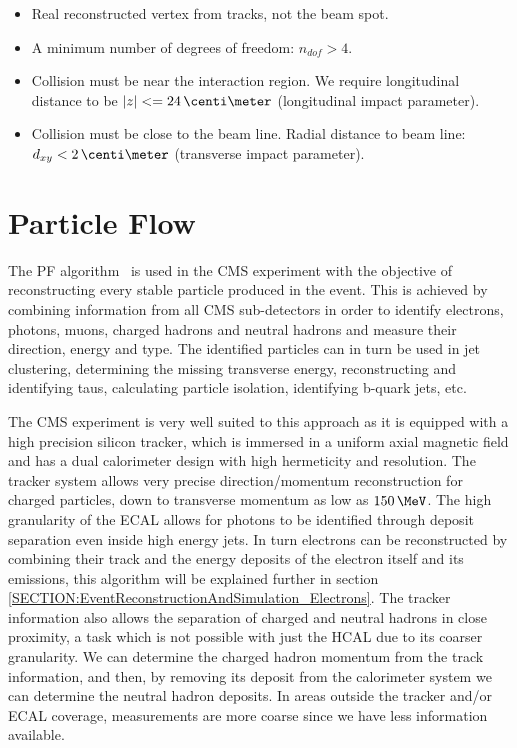 \begin{itemize}
  \item Real reconstructed vertex from tracks, not the beam spot.
  \item A minimum number of degrees of freedom: $n_{dof}>4$.
  \item Collision must be near the interaction region. We require longitudinal distance to be $|z|<=24\,\centi\meter$ (longitudinal impact parameter).
  \item Collision must be close to the beam line. Radial distance to beam line: $d_{xy}<2\,\centi\meter$ (transverse impact parameter). 
\end{itemize}

\section{Particle Flow}
\label{SECTION:EventReconstructionAndSimulation_ParticleFlow}


The \gls{PF} algorithm~\cite{ARTICLE:CMSComissioningOfParticleFlow, ARTICLE:CMSParticleFlowEventRecontruction, ARTICLE:CMSComissioningOfParticleFlowWithMinBias} is used in the \gls{CMS} experiment with the objective of reconstructing every stable particle produced in the event. This is achieved by combining information from all \gls{CMS} sub-detectors in order to identify electrons, photons, muons, charged hadrons and neutral hadrons and measure their direction, energy and type. The identified particles can in turn be used in jet clustering, determining the missing transverse energy, reconstructing and identifying taus, calculating particle isolation, identifying b-quark jets, etc.

The \gls{CMS} experiment is very well suited to this approach as it is equipped with a high precision silicon tracker, which is immersed in a uniform axial magnetic field and has a dual calorimeter design with high hermeticity and resolution. The tracker system allows very precise direction/momentum reconstruction for charged particles, down to transverse momentum as low as $150\,\MeV$. The high granularity of the \gls{ECAL} allows for photons to be identified through deposit separation even inside high energy jets. In turn electrons can be reconstructed by combining their track and the energy deposits of the electron itself and its emissions, this algorithm will be explained further in section \ref{SECTION:EventReconstructionAndSimulation_Electrons}. The tracker information also allows the separation of charged and neutral hadrons in close proximity, a task which is not possible with just the \gls{HCAL} due to its coarser granularity. We can determine the charged hadron momentum from the track information, and then, by removing its deposit from the calorimeter system we can determine the neutral hadron deposits. In areas outside the tracker and/or \gls{ECAL} coverage, measurements are more coarse since we have less information available.

